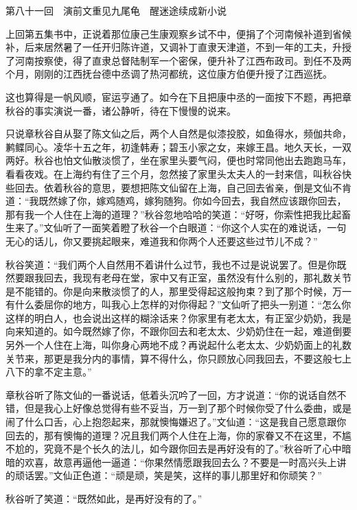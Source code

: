 \documentclass[12pt,UTF8]{ctexbook}
\begin{document}
{{{第八十一回　演前文重见九尾龟　醒迷途续成新小说





上回第五集书中，正说着那位康己生康观察乡试不中，便捐了个河南候补道到省候补，后来居然暑了一任开归陈许道，又调补丁直隶天津道，不到一年的工夫，升授了河南按察使，得了直隶总督陆制军一个密保，便升补了江西布政司。到任不及两个月，刚刚的江西抚台德中丞调了热河都统，这位康方伯便升授了江西巡抚。

这也算得是一帆风顺，宦运亨通了。如今在下且把康中丞的一面按下不题，再把章秋谷的事实演说一番，诸公静听，待在下慢慢的说来。

只说章秋谷自从娶了陈文仙之后，两个人自然是似漆投胶，如鱼得水，频伽共命，鹣鲽同心。凌华十五之年，初逢韩寿；碧玉小家之女，来嫁王昌。地久天长，一双两好。秋谷也怕文仙散淡惯了，坐在家里头要气闷，便也时常同他出去跑跑马车，看看夜戏。在上海约有住了三个月，忽然接了家里头太夫人的一封来信，叫秋谷快些回去。依着秋谷的意思，要想把陈文仙留在上海，自己回去省亲，倒是文仙不肯道：“我既然嫁了你，嫁鸡随鸡，嫁狗随狗。你如今回去，我自然应该跟你回去，那有我一个人住在上海的道理？”秋谷忽地哈哈的笑道：“好呀，你索性把我比起畜生来了。”文仙听了一面笑着瞪了秋谷一个白眼道：“你这个人实在的难说话，一句无心的话儿，你又要挑起眼来，难道我和你两个人还要这些过节儿不成？”

秋谷笑道：“我们两个人自然用不着讲什么过节，我也不过是说说罢了。但是你既然要跟我回去，我现有老母在堂，家中又有正室，虽然没有什么别的，那礼数关节是不能错的。你是向来散淡惯了的人，那里受得起这般拘束？到了那个时候，万一有什么委屈你的地方，叫我心上怎样的对你得起？”文仙听了把头一别道：“怎么你这样的明白人，也会说出这样的糊涂话来？你家里有老太太，有正室少奶奶，我是向来知道的。如今既然嫁了你，不跟你回去和老太太、少奶奶住在一起，难道倒要另外一个人住在上海，叫你身心两地不成？再说起什么老太太、少奶奶面上的礼数关节来，那更是我分内的事情，算不得什么，你只顾放心同我回去，不要这般七上八下的拿不定主意。”

章秋谷听了陈文仙的一番说话，低着头沉吟了一回，方才说道：“你的说话自然不错，但是我心上好像总觉得有些不妥当，万一到了那个时候你受了什么委曲，或是闹了什么口舌，心上抱怨起来，那就懊悔嫌迟了。”文仙道：“这是我自己愿意跟你回去的，那有懊悔的道理？况且我们两个人住在上海，你的家眷又不在这里，不尴不尬的，究竟不是个长久的法儿，如今跟你回去是再好没有的了。”秋谷听了心中暗暗的欢喜，故意再逼他一逼道：“你果然情愿跟我回去么？不要是一时高兴头上讲的顽话罢。”文仙正色道：“顽是顽，笑是笑，这样的事儿那里好和你顽笑？”

秋谷听了笑道：“既然如此，是再好没有的了。”

}}}
\end{document}
